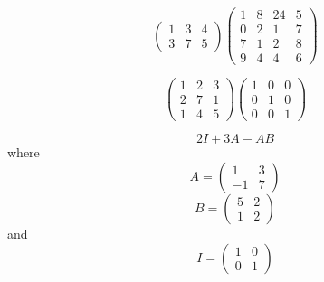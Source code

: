 \begin{equation}
    \begin{pmatrix}
        1       &       3       &       4   \\
        3       &       7       &       5
    \end{pmatrix}
    \begin{pmatrix}
        1       &       8       &       24      &   5   \\
        0       &       2       &       1       &   7   \\
        7       &       1       &       2       &   8   \\
        9       &       4       &       4       &   6
    \end{pmatrix}
\end{equation}

\begin{equation}
    \begin{pmatrix}
        1       &       2       &       3   \\
        2       &       7       &       1   \\
        1       &       4       &       5   
    \end{pmatrix}
    \begin{pmatrix}
        1       &       0       &       0   \\
        0       &       1       &       0   \\
        0       &       0       &       1
    \end{pmatrix}
\end{equation}

\begin{equation}
    2I + 3A -AB
\end{equation}
where
\begin{equation}
    A =
    \begin{pmatrix}
        1       &       3       \\
        -1      &       7       
    \end{pmatrix}
\end{equation}
\begin{equation}
    B =
    \begin{pmatrix}
        5       &       2       \\
        1       &       2       
    \end{pmatrix}
\end{equation}
and
\begin{equation}
    I = 
    \begin{pmatrix}
        1       &       0       \\
        0       &       1   
    \end{pmatrix}
\end{equation}


